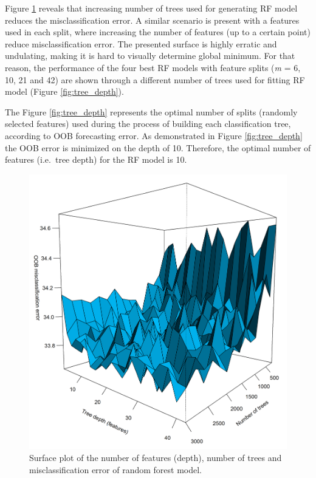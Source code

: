\documentclass[]{elsarticle} %
\begin{document}
Figure \ref{fig:surface} reveals that increasing number of trees used
for generating RF model reduces the misclassification error. A similar
scenario is present with a features used in each split, where increasing
the number of features (up to a certain point) reduce misclassification
error. The presented surface is highly erratic and undulating, making it
is hard to visually determine global minimum. For that reason, the
performance of the four best RF models with feature splits (\emph{m} =
6, 10, 21 and 42) are shown through a different number of trees used for
fitting RF model (Figure \ref{fig:tree_depth}).

The Figure \ref{fig:tree_depth} represents the optimal number of splits
(randomly selected features) used during the process of building each
classification tree, according to OOB forecasting error. As demonstrated
in Figure \ref{fig:tree_depth} the OOB error is minimized on the depth
of 10. Therefore, the optimal number of features (i.e.~tree depth) for
the RF model is 10.

\begin{figure}[H]

{\centering \includegraphics[width=0.7\linewidth]{img/300dpi/Fig_persp} 

}

\caption{Surface plot of the number of features (depth), number of trees and misclassification error of random forest model.}\label{fig:surface}
\end{figure}
\end{document}
